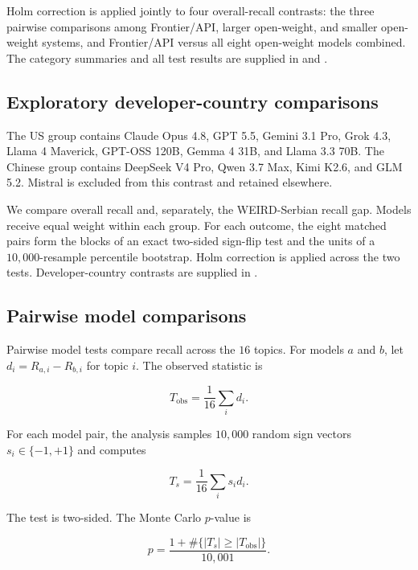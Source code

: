 \documentclass[11pt,a4paper]{article}
\begin{document}
Holm correction is applied jointly to four overall-recall contrasts: the three pairwise comparisons among Frontier/API, larger open-weight, and smaller open-weight systems, and Frontier/API versus all eight open-weight models combined. The category summaries and all test results are supplied in  and .

\subsection{Exploratory developer-country comparisons}
\label{app:country-tests}
The US group contains Claude Opus 4.8, GPT 5.5, Gemini 3.1 Pro, Grok 4.3, Llama 4 Maverick, GPT-OSS 120B, Gemma 4 31B, and Llama 3.3 70B. The Chinese group contains DeepSeek V4 Pro, Qwen 3.7 Max, Kimi K2.6, and GLM 5.2. Mistral is excluded from this contrast and retained elsewhere.

We compare overall recall and, separately, the WEIRD-Serbian recall gap. Models receive equal weight within each group. For each outcome, the eight matched pairs form the blocks of an exact two-sided sign-flip test and the units of a $10{,}000$-resample percentile bootstrap. Holm correction is applied across the two tests. Developer-country contrasts are supplied in .

\subsection{Pairwise model comparisons}
\label{app:model_pair_tests}

Pairwise model tests compare recall across the $16$ topics. For models $a$ and $b$, let $d_i=R_{a,i}-R_{b,i}$ for topic $i$. The observed statistic is

\begin{equation}
 T_{\mathrm{obs}}=\frac{1}{16}\sum_i d_i.
\end{equation}

For each model pair, the analysis samples $10,000$ random sign vectors $s_i\in\{-1,+1\}$ and computes

\begin{equation}
 T_s=\frac{1}{16}\sum_i s_i d_i.
\end{equation}

The test is two-sided. The Monte Carlo $p$-value is

\begin{equation}
 p=\frac{1+\#\{|T_s|\geq|T_{\mathrm{obs}}|\}}{10{,}001}.
\end{equation}
\end{document}
